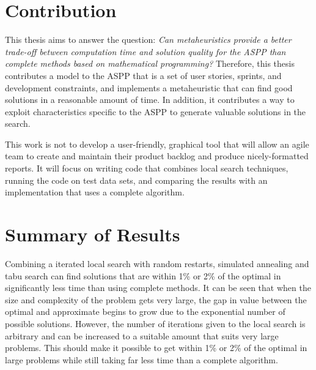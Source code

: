 \section{Contribution}

This thesis aims to answer the question: \emph{Can metaheuristics provide a better trade-off between computation time and solution quality for the ASPP than complete methods based on mathematical programming?} Therefore, this thesis contributes a model to the ASPP that is a set of user stories, sprints, and development constraints, and implements a metaheuristic that can find good solutions in a reasonable amount of time. In addition, it contributes a way to exploit characteristics specific to the ASPP to generate valuable solutions in the search.

This work is not to develop a user-friendly, graphical tool that will allow an agile team to create and maintain their product backlog and produce nicely-formatted reports. It will focus on writing code that combines local search techniques, running the code on test data sets, and comparing the results with an implementation that uses a complete algorithm.

\section{Summary of Results}

Combining a iterated local search with random restarts, simulated annealing and tabu search can find solutions that are within 1\% or 2\% of the optimal in significantly less time than using complete methods. It can be seen that when the size and complexity of the problem gets very large, the gap in value between the optimal and approximate begins to grow due to the exponential number of possible solutions. However, the number of iterations given to the local search is arbitrary and can be increased to a suitable amount that suits very large problems. This should make it possible to get within 1\% or 2\% of the optimal in large problems while still taking far less time than a complete algorithm.